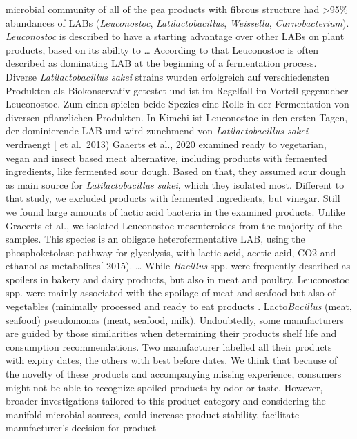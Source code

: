 \documentclass[preprint, 3p,
authoryear]{elsarticle} %
\begin{document}
microbial community of all of the pea products with fibrous structure
had \textgreater95\% abundances of LABs (\emph{Leuconostoc},
\emph{Latilactobacillus}, \emph{Weissella}, \emph{Carnobacterium}).
\emph{Leuconostoc} is described to have a starting advantage over other
LABs on plant products, based on its ability to \ldots{} According to
that Leuconostoc is often described as dominating LAB at the beginning
of a fermentation process.\\
Diverse \emph{Latilactobacillus sakei} strains wurden erfolgreich auf
verschiedensten Produkten als Biokonservativ getestet und ist im
Regelfall im Vorteil gegenueber Leuconostoc. Zum einen spielen beide
Spezies eine Rolle in der Fermentation von diversen pflanzlichen
Produkten. In Kimchi ist Leuconostoc in den ersten Tagen, der
dominierende LAB und wird zunehmend von \emph{Latilactobacillus sakei}
verdraengt {[}\citet{Jeong} et al.~2013) Gaaerts et al., 2020 examined
ready to vegetarian, vegan and insect based meat alternative, including
products with fermented ingredients, like fermented sour dough. Based on
that, they assumed sour dough as main source for \emph{Latilactobacillus
sakei}, which they isolated most. Different to that study, we excluded
products with fermented ingredients, but vinegar. Still we found large
amounts of lactic acid bacteria in the examined products. Unlike
Graeerts et al., we isolated Leuconostoc mesenteroides from the majority
of the samples. This species is an obligate heterofermentative LAB,
using the phosphoketolase pathway for glycolysis, with lactic acid,
acetic acid, CO2 and ethanol as metabolites{[}\citet{Gaenzle} 2015).
\ldots{} While \emph{Bacillus} spp. were frequently described as
spoilers in bakery and dairy products, but also in meat and poultry,
Leuconostoc spp. were mainly associated with the spoilage of meat and
seafood but also of vegetables (minimally processed and ready to eat
products \citep{Lianou.2016}. Lacto\emph{Bacillus} (meat, seafood)
pseudomonas (meat, seafood, milk). Undoubtedly, some manufacturers are
guided by those similarities when determining their products shelf life
and consumption recommendations. Two manufacturer labelled all their
products with expiry dates, the others with best before dates. We think
that because of the novelty of these products and accompanying missing
experience, consumers might not be able to recognize spoiled products by
odor or taste. However, broader investigations tailored to this product
category and considering the manifold microbial sources, could increase
product stability, facilitate manufacturer's decision for product
\end{document}
